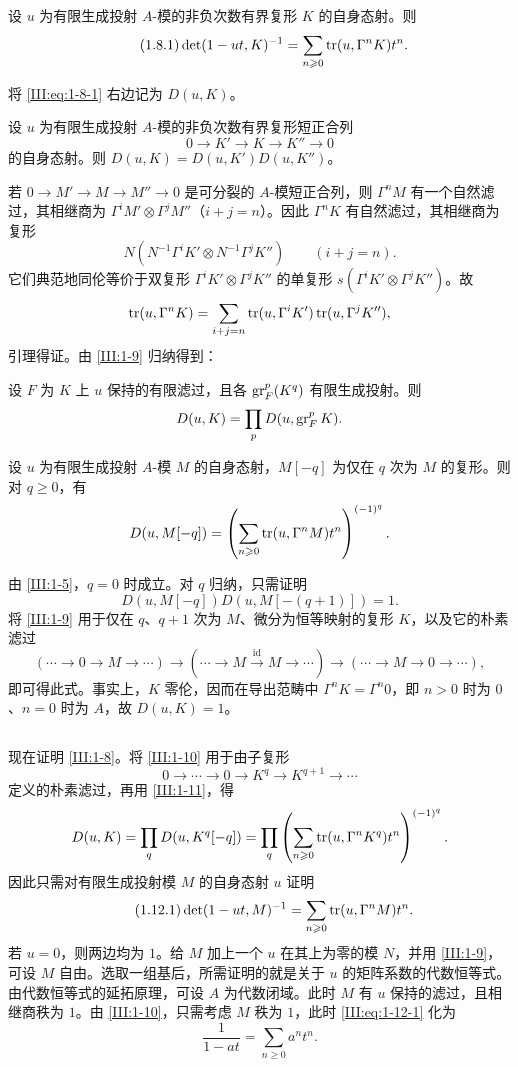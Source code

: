 \begin{proposition_}\label{III:1-8}
设 $u$ 为有限生成投射 $A$-模的非负次数有界复形 $K$ 的自身态射。则
\begin{equation*}\tag{1.8.1}\label{III:eq:1-8-1}
\det(1-ut,K)^{-1}=\sum_{n\geqslant0}\operatorname{tr}(u,\Gamma^nK)t^n.
\end{equation*}
\end{proposition_}
将 \eqref{III:eq:1-8-1} 右边记为 $D(u,K)$。
\begin{lemma_}\label{III:1-9}
设 $u$ 为有限生成投射 $A$-模的非负次数有界复形短正合列
\[0\to K'\to K\to K''\to0\]
的自身态射。则 $D(u,K)=D(u,K')D(u,K'')$。
\end{lemma_}
若 $0\to M'\to M\to M''\to0$ 是可分裂的 $A$-模短正合列，则 $\Gamma^nM$ 有一个自然滤过，其相继商为 $\Gamma^iM'\otimes\Gamma^jM''$（$i+j=n$）。因此 $\Gamma^nK$ 有自然滤过，其相继商为复形
\[N(N^{-1}\Gamma^iK'\otimes N^{-1}\Gamma^jK'')\qquad(i+j=n).\]
它们典范地同伦等价于双复形 $\Gamma^iK'\otimes\Gamma^jK''$ 的单复形 $s(\Gamma^iK'\otimes\Gamma^jK'')$。故
\[\operatorname{tr}(u,\Gamma^nK)=\sum_{i+j=n}\operatorname{tr}(u,\Gamma^iK')\operatorname{tr}(u,\Gamma^jK''),\]
引理得证。由 \ref{III:1-9} 归纳得到：
\begin{lemma_}\label{III:1-10}
设 $F$ 为 $K$ 上 $u$ 保持的有限滤过，且各 $\operatorname{gr}_F^p(K^q)$ 有限生成投射。则
\[D(u,K)=\prod_pD(u,\operatorname{gr}_F^pK).\]
\end{lemma_}

\begin{lemma_}\label{III:1-11}
设 $u$ 为有限生成投射 $A$-模 $M$ 的自身态射，$M[-q]$ 为仅在 $q$ 次为 $M$ 的复形。则对 $q\geqslant0$，有
\[D(u,M[-q])=\left(\sum_{n\geqslant0}\operatorname{tr}(u,\Gamma^nM)t^n\right)^{(-1)^q}.\]
\end{lemma_}
由 \ref{III:1-5}，$q=0$ 时成立。对 $q$ 归纳，只需证明
\[D(u,M[-q])D(u,M[-(q+1)])=1.\]
将 \ref{III:1-9} 用于仅在 $q$、$q+1$ 次为 $M$、微分为恒等映射的复形 $K$，以及它的朴素滤过
\[(\cdots\to0\to M\to\cdots)\longrightarrow(\cdots\to M\xrightarrow{\mathrm{id}}M\to\cdots)\longrightarrow(\cdots\to M\to0\to\cdots),\]
即可得此式。事实上，$K$ 零伦，因而在导出范畴中 $\Gamma^nK=\Gamma^n0$，即 $n>0$ 时为 $0$、$n=0$ 时为 $A$，故 $D(u,K)=1$。

\subsection{}\label{III:1-12}
现在证明 \ref{III:1-8}。将 \ref{III:1-10} 用于由子复形
\[0\to\cdots\to0\to K^q\to K^{q+1}\to\cdots\]
定义的朴素滤过，再用 \ref{III:1-11}，得
\[D(u,K)=\prod_qD(u,K^q[-q])=\prod_q\left(\sum_{n\geqslant0}\operatorname{tr}(u,\Gamma^nK^q)t^n\right)^{(-1)^q}.\]
因此只需对有限生成投射模 $M$ 的自身态射 $u$ 证明
\begin{equation*}\tag{1.12.1}\label{III:eq:1-12-1}
\det(1-ut,M)^{-1}=\sum_{n\geqslant0}\operatorname{tr}(u,\Gamma^nM)t^n.
\end{equation*}
若 $u=0$，则两边均为 $1$。给 $M$ 加上一个 $u$ 在其上为零的模 $N$，并用 \ref{III:1-9}，可设 $M$ 自由。选取一组基后，所需证明的就是关于 $u$ 的矩阵系数的代数恒等式。由代数恒等式的延拓原理，可设 $A$ 为代数闭域。此时 $M$ 有 $u$ 保持的滤过，且相继商秩为 $1$。由 \ref{III:1-10}，只需考虑 $M$ 秩为 $1$，此时 \eqref{III:eq:1-12-1} 化为
\[\frac1{1-at}=\sum_{n\geqslant0}a^nt^n.\]

